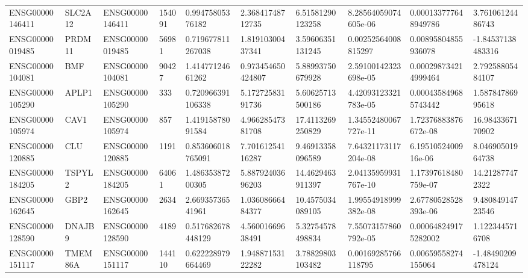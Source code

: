 \begin{tabular}{@{}llllllllll@{}}
ENSG00000146411 & SLC2A12 & ENSG00000146411 & 154091 & 0.99475805376182 & 2.36841748712735 & 6.51581290123258 & 8.28564059074605e-06 & 0.000133777648949786 & 3.76106124486743 \\
ENSG00000019485 & PRDM11 & ENSG00000019485 & 56981 & 0.719677811267038 & 1.81910300437341 & 3.59606351131245 & 0.00252564008815297 & 0.00895804855936078 & -1.84537138483316 \\
ENSG00000104081 & BMF & ENSG00000104081 & 90427 & 1.41477124661262 & 0.973454650424807 & 5.88993750679928 & 2.59100142323698e-05 & 0.000298734214999464 & 2.79258805484107 \\
ENSG00000105290 & APLP1 & ENSG00000105290 & 333 & 0.720966391106338 & 5.17272583191736 & 5.60625713500186 & 4.42093123321783e-05 & 0.000435849685743442 & 1.58784786995618 \\
ENSG00000105974 & CAV1 & ENSG00000105974 & 857 & 1.41915878091584 & 4.96628547381708 & 17.4113269250829 & 1.34552480067727e-11 & 1.72376883876672e-08 & 16.9843367170902 \\
ENSG00000120885 & CLU & ENSG00000120885 & 1191 & 0.853606018765091 & 7.70161254116287 & 9.46913358096589 & 7.64321173117204e-08 & 6.1951052400916e-06 & 8.04690501964738 \\
ENSG00000184205 & TSPYL2 & ENSG00000184205 & 64061 & 1.48635387200305 & 5.88792403696203 & 14.4629463911397 & 2.04135959931767e-10 & 1.17397618480759e-07 & 14.212877472322 \\
ENSG00000162645 & GBP2 & ENSG00000162645 & 2634 & 2.66935736541961 & 1.03608666484377 & 10.4575034089105 & 1.99554918999382e-08 & 2.67780528528393e-06 & 9.48084914723546 \\
ENSG00000128590 & DNAJB9 & ENSG00000128590 & 4189 & 0.517682678448129 & 4.56001669638491 & 5.32754578498834 & 7.55073157860792e-05 & 0.000648249175282002 & 1.1223445716708 \\
ENSG00000151117 & TMEM86A & ENSG00000151117 & 144110 & 0.622228979664469 & 1.94887153122282 & 3.78829803103482 & 0.00169285766118795 & 0.00659558274155064 & -1.48490209478124 \\
\bottomrule
\end{tabular}
\endgroup
